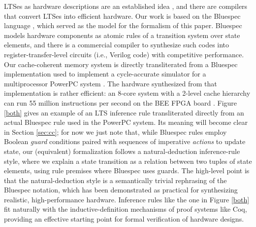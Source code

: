 LTSes as hardware descriptions are an established
idea \cite{HoeArvind:TRSSynthesis1, Hoe:TCAD}, and there are compilers that
convert LTSes into efficient hardware.  Our work is based on the Bluespec
language \cite{BSV:LangRef, Bluespec:TFRG}, which served as the model for the
formalism of this paper.  Bluespec models hardware components as atomic rules
of a transition system over state elements, and there is a commercial compiler
to synthesize such codes into register-transfer-level circuits (i.e., Verilog code) with
competitive performance.  Our cache-coherent memory system is directly
transliterated from a Bluespec
implementation \cite{DNA:CoherenceImplementation} used to implement a
cycle-accurate simulator for a multiprocessor PowerPC system \cite{Khan:PowerPc}. The hardware synthesized
from that implementation is rather efficient: an 8-core system with a 2-level
cache hierarchy can run 55 million instructions per second on the BEE FPGA
board \cite{bee2}. Figure \ref{both} gives an example of an LTS inference rule
transliterated directly from an actual Bluespec rule used in the PowerPC
system.  Its meaning will become clear in Section \ref{sec:cc};
for now we just note that, while Bluespec rules employ Boolean \emph{guard}
conditions paired with sequences of imperative \emph{actions} to update state,
our (equivalent) formalization follows a natural-deduction inference-rule style,
where we explain a state transition as a relation between two tuples of state
elements, using rule premises where Bluespec uses guards.  The high-level point
is that the natural-deduction style is a semantically trivial rephrasing of the
Bluespec notation, which has been demonstrated as practical for synthesizing
realistic, high-performance hardware.  Inference rules like the one in
Figure \ref{both} fit naturally with the inductive-definition mechanisms of
proof systems like Coq, providing an effective starting point for formal
verification of hardware designs.

